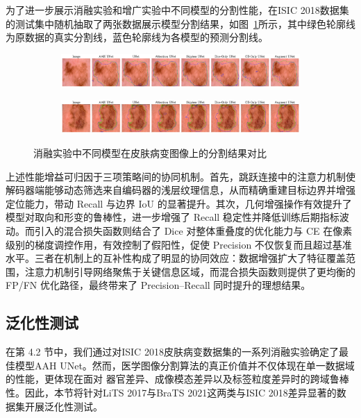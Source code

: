 为了进一步展示消融实验和增广实验中不同模型的分割性能，在ISIC 2018数据集的测试集中随机抽取了两张数据展示模型分割结果，如图~\ref{fig:ablation_results}所示，其中绿色轮廓线为原数据的真实分割线，蓝色轮廓线为各模型的预测分割线。

\begin{figure}[!htbp]
    \centering
    \begin{subfigure}{\linewidth}
        \centering
        \includegraphics[width=\linewidth]{fig/ablation_compare_row1.png}
    \end{subfigure}
    
    \vspace{0.5em}  %

    \begin{subfigure}{\linewidth}
        \centering
        \includegraphics[width=\linewidth]{fig/ablation_compare_row2.png}
    \end{subfigure}

    \caption{消融实验中不同模型在皮肤病变图像上的分割结果对比}
    \label{fig:ablation_results}
\end{figure}

上述性能增益可归因于三项策略间的协同机制。首先，跳跃连接中的注意力机制使解码器端能够动态筛选来自编码器的浅层纹理信息，从而精确重建目标边界并增强定位能力，带动 Recall 与边界 IoU 的显著提升。其次，几何增强操作有效提升了模型对取向和形变的鲁棒性，进一步增强了 Recall 稳定性并降低训练后期指标波动。而引入的混合损失函数则结合了 Dice 对整体重叠度的优化能力与 CE 在像素级别的梯度调控作用，有效控制了假阳性，促使 Precision 不仅恢复而且超过基准水平。三者在机制上的互补性构成了明显的协同效应：数据增强扩大了特征覆盖范围，注意力机制引导网络聚焦于关键信息区域，而混合损失函数则提供了更均衡的 FP/FN 优化路径，最终带来了 Precision–Recall 同时提升的理想结果。

\subsection{泛化性测试}

在第 4.2 节中，我们通过对ISIC 2018皮肤病变数据集的一系列消融实验确定了最佳模型AAH UNet。然而，医学图像分割算法的真正价值并不仅体现在单一数据域的性能，更体现在面对 器官差异、成像模态差异以及标签粒度差异时的跨域鲁棒性。因此，本节将针对LiTS 2017与BraTS 2021这两类与ISIC 2018差异显著的数据集开展泛化性测试。

